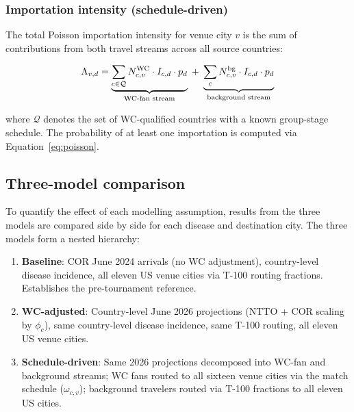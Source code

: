 \documentclass[12pt]{article}
\begin{document}
\subsubsection*{Importation intensity (schedule-driven)}

The total Poisson importation intensity for venue city $v$ is the sum
of contributions from both travel streams across all source countries:

\begin{equation}
  \Lambda_{v,d} =
    \underbrace{%
      \sum_{c \in \mathcal{Q}}
        N_{c,v}^{\text{WC}} \cdot I_{c,d} \cdot p_d
    }_{\text{WC-fan stream}}
    \;+\;
    \underbrace{%
      \sum_{c}
        N_{c,v}^{\text{bg}} \cdot I_{c,d} \cdot p_d
    }_{\text{background stream}}
  \label{eq:lambda_schedule}
\end{equation}

where $\mathcal{Q}$ denotes the set of WC-qualified countries with a
known group-stage schedule. The probability of at least one
importation is computed via Equation~\ref{eq:poisson}.

\subsection*{Three-model comparison}

To quantify the effect of each modelling assumption, results from the
three models are compared side by side for each disease and destination
city. The three models form a nested hierarchy:

\begin{enumerate}
  \item \textbf{Baseline}: COR June 2024 arrivals (no WC adjustment),
    country-level disease incidence, all eleven US venue cities via
    T-100 routing fractions. Establishes the pre-tournament reference.
  \item \textbf{WC-adjusted}: Country-level June 2026 projections
    (NTTO + COR scaling by $\phi_c$), same country-level disease
    incidence, same T-100 routing, all eleven US venue cities.
  \item \textbf{Schedule-driven}: Same 2026 projections decomposed into
    WC-fan and background streams; WC fans routed to all sixteen venue
    cities via the match schedule ($\omega_{c,v}$); background travelers
    routed via T-100 fractions to all eleven US cities.
\end{enumerate}
\end{document}
